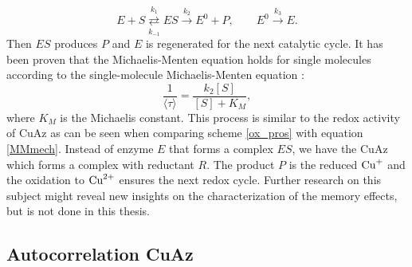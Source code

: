 \documentclass[twoside,single]{lion-msc}
\begin{document}
\begin{equation}\label{MMmech}
E + S \overset{k_{1}}{\underset{k_{-1}}\rightleftarrows} ES \overset{k_{2}}\rightarrow E^{0} + P,  \qquad E^{0} \overset{k_{3}}\rightarrow E.
\end{equation}
Then $ES$ produces $P$ and $E$ is regenerated for the next catalytic cycle. It has been proven that the Michaelis-Menten equation holds for single molecules according to the single-molecule Michaelis-Menten equation \cite{English2006}:
\begin{equation}\label{MMmech1}
\frac{1}{\langle \tau \rangle} = \frac{k_{2}[S]}{[S]+K_{M}},
\end{equation}
 where $K_{M}$ is the Michaelis constant. This process is similar to the redox activity of CuAz as can be seen when comparing scheme \ref{ox_pros} with equation \ref{MMmech}. Instead of enzyme $E$ that forms a complex $ES$, we have the CuAz which forms a complex with reductant $R$. The product $P$ is the reduced $\textup{Cu}^{+}$ and the oxidation to $\textup{Cu}^{2+}$ ensures the next redox cycle. Further research on this subject might reveal new insights on the characterization of the memory effects, but is not done in this thesis.

\subsection{Autocorrelation CuAz} \label{autocor}
\end{document}
